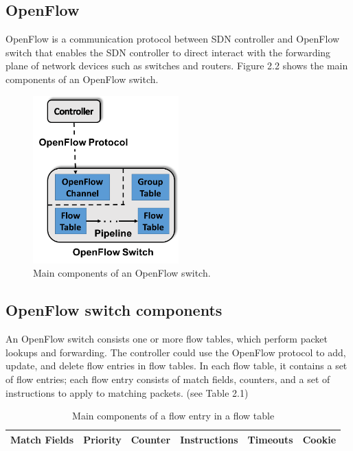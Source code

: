 \documentclass[a4paper,12pt]{report}
\begin{document}
\begin{CJK*}{UTF8}{bkai}
\begin{large}
    \section{OpenFlow}
      \qquad OpenFlow is a communication protocol between SDN controller and OpenFlow switch that enables the SDN 
                controller to direct interact with the forwarding plane of network devices such as switches and 
                routers. Figure 2.2 shows the main components of an OpenFlow switch.
        \begin{figure}[hb]
          \caption{Main components of an OpenFlow switch.}
          \centering
            \includegraphics[width=0.5\textwidth]{OpenFlow.png}
        \end{figure}
        \subsection{OpenFlow switch components}
        \qquad An OpenFlow switch consists one or more flow tables, which perform packet lookups and forwarding. The controller could use the OpenFlow protocol to add, update, and delete flow entries in flow tables. In each flow table, it contains a set of flow entries; each flow entry consists of match fields, counters, and a set of instructions to apply to matching packets. (see Table 2.1)\\
        \begin{table}
          \centering
          \begin{tabular}[c]{|l|l|l|l|l|l|}
          \hline
          Match Fields & Priority & Counter & Instructions & Timeouts & Cookie \\
          \hline
          \end{tabular}
          \caption{Main components of a flow entry in a flow table}
        \end{table}

\end{large}
\end{CJK*}
\end{document}
